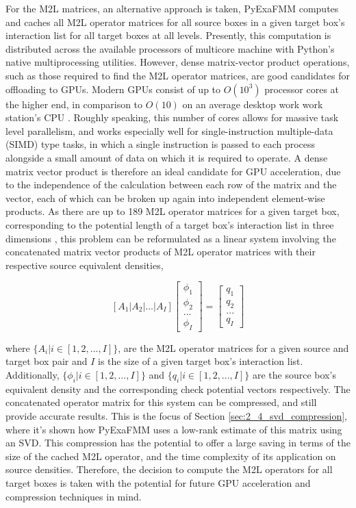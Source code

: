 For the M2L matrices, an alternative approach is taken, \gls{PyExaFMM} computes
and caches all M2L operator matrices for all source boxes in a given target box's
interaction list for all target boxes at all levels. Presently, this computation is distributed across
the available processors of multicore machine
with Python's native multiprocessing utilities. However, dense matrix-vector
product operations, such as those required to find the \gls{M2L} operator
matrices, are good candidates for offloading to \gls{GPU}s. Modern \gls{GPU}s
consist of up to $O(10^3)$ processor cores at the higher end,
in comparison to $O(10)$ on an average desktop work work station's CPU
\cite{Hwu:2011:MKP}. Roughly speaking, this number of cores allows for massive task level parallelism,
and works especially well for single-instruction multiple-data (\gls{SIMD}) type tasks, in which
a single instruction is passed to each process alongside a small amount of data on which it
is required to operate. A dense matrix vector product is therefore an ideal
candidate for GPU acceleration, due to the independence of the calculation between each row
of the matrix and the vector, each of which can be broken up again into independent element-wise
products. As there are up to 189 M2L operator matrices for a given
target box, corresponding to the potential length of a target box's interaction
list in three dimensions \cite{Ying:2004:JCP}, this problem can be reformulated
as a linear system involving the concatenated matrix vector products of M2L
operator matrices with their respective source equivalent densities,

\begin{equation}
    \left [ A_1 | A_2 | ... | A_I \right] \begin{bmatrix} \phi_1 \\ \phi_2 \\  ... \\  \phi_I \end{bmatrix} = \begin{bmatrix} q_1\\ q_2\\  ... \\  q_I \end{bmatrix}
    \label{eq:2_3_concatenated_m2l}
\end{equation}

where $\{A_i | i \in [1, 2, ..., I]\}$, are the M2L operator matrices for a given
source and target box pair and $I$ is the size of a given
target box's interaction list. Additionally, $\{\phi_i | i \in [1,2, ..., I]\}$ and $\{q_i | i \in [1,2, ..., I]\}$
are the source box's equivalent density and the corresponding check potential vectors
respectively. The concatenated operator matrix for this system can be compressed, and still
provide accurate results. This is the focus of Section \ref{sec:2_4_svd_compression},
where it's shown how \gls{PyExaFMM} uses a low-rank estimate of this matrix using
an \gls{SVD}. This compression has the potential to offer a large saving in terms
of the size of the cached M2L operator, and the time complexity of its application
on source densities. Therefore, the decision to compute the \gls{M2L} operators for
all target boxes is taken with the potential for future GPU acceleration and
compression techniques in mind.

